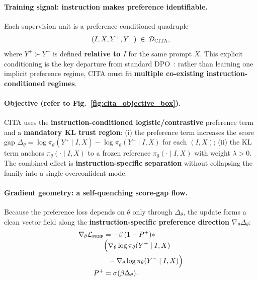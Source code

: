 \vspace{-0.35em}
\paragraph{Training signal: instruction makes preference identifiable.}
Each supervision unit is a preference-conditioned quadruple
\[
(I, X, Y^{+}, Y^{-}) \;\in\; \mathcal{D}_{\textsc{CITA}},
\]
where $Y^+\succ Y^-$ is defined \textbf{relative to $I$} for the same prompt $X$.
This explicit conditioning is the key departure from standard DPO~\cite{rafailov2023direct}: rather than learning one implicit preference regime, CITA must fit \textbf{multiple co-existing instruction-conditioned regimes}.

\vspace{-0.35em}
\paragraph{Objective (refer to Fig.~\ref{fig:cita_objective_box}).}
CITA uses the \textbf{instruction-conditioned logistic/contrastive} preference term and a \textbf{mandatory KL trust region}:
(i) the preference term increases the score gap $\Delta_\theta=\log\pi_\theta(Y^+\!\mid I,X)-\log\pi_\theta(Y^-\!\mid I,X)$ for each $(I,X)$;
(ii) the KL term anchors $\pi_\theta(\cdot\mid I,X)$ to a frozen reference $\pi_0(\cdot\mid I,X)$ with weight $\lambda>0$.
The combined effect is \textbf{instruction-specific separation} without collapsing the family into a single overconfident mode.

\vspace{-0.35em}
\paragraph{Gradient geometry: a self-quenching score-gap flow.}
Because the preference loss depends on $\theta$ only through $\Delta_\theta$, the update forms a clean vector field along the
\textbf{instruction-specific preference direction} $\nabla_\theta \Delta_\theta$:
\[
\begin{aligned}
\nabla_{\theta}\mathcal{L}_{\textsc{pref}}
&=
-\beta\,(1-P^{+})*
\\[-0.35em]
&
\begin{aligned}[t]
\Big(
&\nabla_{\theta}\log \pi_{\theta}(Y^{+}\mid I,X)\\
&-\nabla_{\theta}\log \pi_{\theta}(Y^{-}\mid I,X)
\Big)
\end{aligned}
\\[-0.15em]
P^{+}&=\sigma(\beta\Delta_\theta).
\end{aligned}
\]







